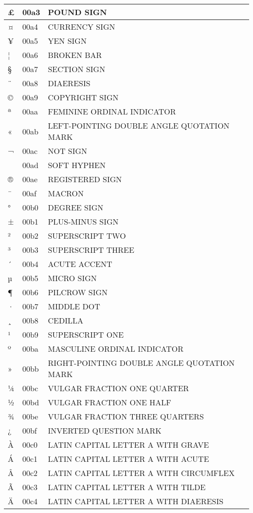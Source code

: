 \documentclass[12pt,letterpaper,openany]{book}
\begin{document}
\begin{center}
\begin{supertabular}{|m{0.25in}|m{0.5in}|m{4in}|}
£ & 00a3 & POUND SIGN\\\hline
¤ & 00a4 & CURRENCY SIGN\\\hline
¥ & 00a5 & YEN SIGN\\\hline
¦ & 00a6 & BROKEN BAR\\\hline
§ & 00a7 & SECTION SIGN\\\hline
¨ & 00a8 & DIAERESIS\\\hline
© & 00a9 & COPYRIGHT SIGN\\\hline
ª & 00aa & FEMININE ORDINAL INDICATOR\\\hline
« & 00ab & LEFT-POINTING DOUBLE ANGLE QUOTATION MARK\\\hline
¬ & 00ac & NOT SIGN\\\hline
­ & 00ad & SOFT HYPHEN\\\hline
® & 00ae & REGISTERED SIGN\\\hline
¯ & 00af & MACRON\\\hline
° & 00b0 & DEGREE SIGN\\\hline
± & 00b1 & PLUS-MINUS SIGN\\\hline
² & 00b2 & SUPERSCRIPT TWO\\\hline
³ & 00b3 & SUPERSCRIPT THREE\\\hline
´ & 00b4 & ACUTE ACCENT\\\hline
µ & 00b5 & MICRO SIGN\\\hline
¶ & 00b6 & PILCROW SIGN\\\hline
· & 00b7 & MIDDLE DOT\\\hline
¸ & 00b8 & CEDILLA\\\hline
¹ & 00b9 & SUPERSCRIPT ONE\\\hline
º & 00ba & MASCULINE ORDINAL INDICATOR\\\hline
» & 00bb & RIGHT-POINTING DOUBLE ANGLE QUOTATION MARK\\\hline
¼ & 00bc & VULGAR FRACTION ONE QUARTER\\\hline
½ & 00bd & VULGAR FRACTION ONE HALF\\\hline
¾ & 00be & VULGAR FRACTION THREE QUARTERS\\\hline
¿ & 00bf & INVERTED QUESTION MARK\\\hline
À & 00c0 & LATIN CAPITAL LETTER A WITH GRAVE\\\hline
Á & 00c1 & LATIN CAPITAL LETTER A WITH ACUTE\\\hline
Â & 00c2 & LATIN CAPITAL LETTER A WITH CIRCUMFLEX\\\hline
Ã & 00c3 & LATIN CAPITAL LETTER A WITH TILDE\\\hline
Ä & 00c4 & LATIN CAPITAL LETTER A WITH DIAERESIS\\\hline

\end{supertabular}
\end{center}
\end{document}

